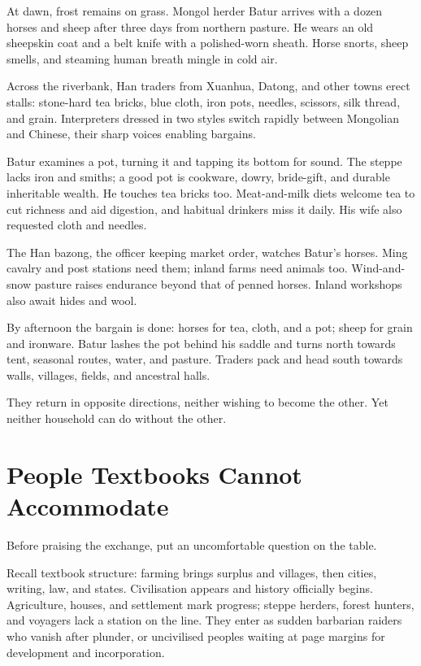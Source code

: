 At dawn, frost remains on grass. Mongol herder Batur arrives with a dozen horses and sheep after three days from northern pasture. He wears an old sheepskin coat and a belt knife with a polished-worn sheath. Horse snorts, sheep smells, and steaming human breath mingle in cold air.

Across the riverbank, Han traders from Xuanhua, Datong, and other towns erect stalls: stone-hard tea bricks, blue cloth, iron pots, needles, scissors, silk thread, and grain. Interpreters dressed in two styles switch rapidly between Mongolian and Chinese, their sharp voices enabling bargains.

Batur examines a pot, turning it and tapping its bottom for sound. The steppe lacks iron and smiths; a good pot is cookware, dowry, bride-gift, and durable inheritable wealth. He touches tea bricks too. Meat-and-milk diets welcome tea to cut richness and aid digestion, and habitual drinkers miss it daily. His wife also requested cloth and needles.

The Han bazong, the officer keeping market order, watches Batur's horses. Ming cavalry and post stations need them; inland farms need animals too. Wind-and-snow pasture raises endurance beyond that of penned horses. Inland workshops also await hides and wool.

By afternoon the bargain is done: horses for tea, cloth, and a pot; sheep for grain and ironware. Batur lashes the pot behind his saddle and turns north towards tent, seasonal routes, water, and pasture. Traders pack and head south towards walls, villages, fields, and ancestral halls.

They return in opposite directions, neither wishing to become the other. Yet neither household can do without the other.

\section{People Textbooks Cannot Accommodate}
Before praising the exchange, put an uncomfortable question on the table.

Recall textbook structure: farming brings surplus and villages, then cities, writing, law, and states. Civilisation appears and history officially begins. Agriculture, houses, and settlement mark progress; steppe herders, forest hunters, and voyagers lack a station on the line. They enter as sudden barbarian raiders who vanish after plunder, or uncivilised peoples waiting at page margins for development and incorporation.

